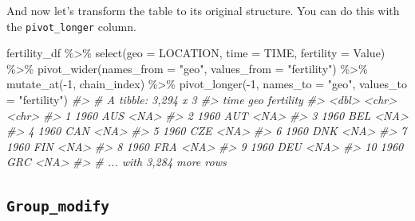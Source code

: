 \documentclass[
]{article}
\newenvironment{Shaded}{\begin{snugshade}}{\end{snugshade}}
\newcommand{\AttributeTok}[1]{\textcolor[rgb]{0.77,0.63,0.00}{#1}}
\newcommand{\CommentTok}[1]{\textcolor[rgb]{0.56,0.35,0.01}{\textit{#1}}}
\newcommand{\DecValTok}[1]{\textcolor[rgb]{0.00,0.00,0.81}{#1}}
\newcommand{\FunctionTok}[1]{\textcolor[rgb]{0.00,0.00,0.00}{#1}}
\newcommand{\NormalTok}[1]{#1}
\newcommand{\SpecialCharTok}[1]{\textcolor[rgb]{0.00,0.00,0.00}{#1}}
\newcommand{\StringTok}[1]{\textcolor[rgb]{0.31,0.60,0.02}{#1}}
\begin{document}
And now let's transform the table to its original structure. You can do this with the \texttt{pivot\_longer} column.

\begin{Shaded}
\begin{Highlighting}[]
\NormalTok{fertility\_df }\SpecialCharTok{\%\textgreater{}\%} 
  \FunctionTok{select}\NormalTok{(}\AttributeTok{geo =}\NormalTok{ LOCATION, }\AttributeTok{time =}\NormalTok{ TIME, }\AttributeTok{fertility =}\NormalTok{ Value) }\SpecialCharTok{\%\textgreater{}\%} 
  \FunctionTok{pivot\_wider}\NormalTok{(}\AttributeTok{names\_from =} \StringTok{"geo"}\NormalTok{, }\AttributeTok{values\_from =} \StringTok{"fertility"}\NormalTok{) }\SpecialCharTok{\%\textgreater{}\%} 
  \FunctionTok{mutate\_at}\NormalTok{(}\SpecialCharTok{{-}}\DecValTok{1}\NormalTok{, chain\_index) }\SpecialCharTok{\%\textgreater{}\%} 
  \FunctionTok{pivot\_longer}\NormalTok{(}\SpecialCharTok{{-}}\DecValTok{1}\NormalTok{, }\AttributeTok{names\_to =} \StringTok{"geo"}\NormalTok{, }\AttributeTok{values\_to =} \StringTok{"fertility"}\NormalTok{)}
\CommentTok{\#\textgreater{} \# A tibble: 3,294 x 3}
\CommentTok{\#\textgreater{}     time geo   fertility}
\CommentTok{\#\textgreater{}    \textless{}dbl\textgreater{} \textless{}chr\textgreater{} \textless{}chr\textgreater{}    }
\CommentTok{\#\textgreater{}  1  1960 AUS   \textless{}NA\textgreater{}     }
\CommentTok{\#\textgreater{}  2  1960 AUT   \textless{}NA\textgreater{}     }
\CommentTok{\#\textgreater{}  3  1960 BEL   \textless{}NA\textgreater{}     }
\CommentTok{\#\textgreater{}  4  1960 CAN   \textless{}NA\textgreater{}     }
\CommentTok{\#\textgreater{}  5  1960 CZE   \textless{}NA\textgreater{}     }
\CommentTok{\#\textgreater{}  6  1960 DNK   \textless{}NA\textgreater{}     }
\CommentTok{\#\textgreater{}  7  1960 FIN   \textless{}NA\textgreater{}     }
\CommentTok{\#\textgreater{}  8  1960 FRA   \textless{}NA\textgreater{}     }
\CommentTok{\#\textgreater{}  9  1960 DEU   \textless{}NA\textgreater{}     }
\CommentTok{\#\textgreater{} 10  1960 GRC   \textless{}NA\textgreater{}     }
\CommentTok{\#\textgreater{} \# ... with 3,284 more rows}
\end{Highlighting}
\end{Shaded}

\hypertarget{group_modify}{%
\subsection{\texorpdfstring{\texttt{Group\_modify}}{Group\_modify}}\label{group_modify}}
\end{document}
